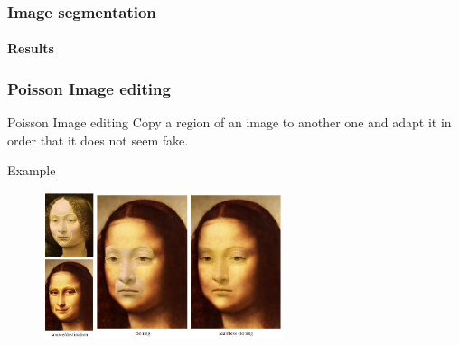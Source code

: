 \documentclass[11pt]{beamer}
\begin{document}
\begin{frame}
\frametitle{Image segmentation}
\framesubtitle{Results}
\begin{center}
\end{center}



\end{frame}


\begin{frame}
\frametitle{Poisson Image editing}

\begin{block}{Poisson Image editing}
Copy a region of an image to another one and adapt it in order that it does not seem fake.
\end{block}

\begin{exampleblock}{Example}
\begin{figure}
    \centering
    \includegraphics[width=70mm]{Example.png}
\end{figure}
\end{exampleblock}
\end{frame}
\end{document}
